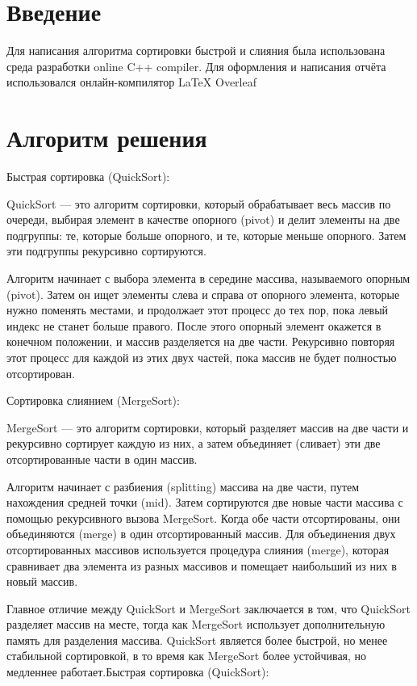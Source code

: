 \documentclass[14pt,a4paper]{scrartcl}
\begin{document}
\tableofcontents
\newpage
\section{Введение}
Для написания алгоритма сортировки быстрой и слияния  была использована среда разработки online C++ compiler. Для оформления и написания отчёта использовался онлайн-компилятор LaTeX Overleaf


\newpage
\section{Алгоритм решения}
Быстрая сортировка (QuickSort):

QuickSort — это алгоритм сортировки, который обрабатывает весь массив по очереди, выбирая элемент в качестве опорного (pivot) и делит элементы на две подгруппы: те, которые больше опорного, и те, которые меньше опорного. Затем эти подгруппы рекурсивно сортируются.

Алгоритм начинает с выбора элемента в середине массива, называемого опорным (pivot). Затем он ищет элементы слева и справа от опорного элемента, которые нужно поменять местами, и продолжает этот процесс до тех пор, пока левый индекс не станет больше правого. После этого опорный элемент окажется в конечном положении, и массив разделяется на две части. Рекурсивно повторяя этот процесс для каждой из этих двух частей, пока массив не будет полностью отсортирован.

Сортировка слиянием (MergeSort):

MergeSort — это алгоритм сортировки, который разделяет массив на две части и рекурсивно сортирует каждую из них, а затем объединяет (сливает) эти две отсортированные части в один массив.

Алгоритм начинает с разбиения (splitting) массива на две части, путем нахождения средней точки (mid). Затем сортируются две новые части массива с помощью рекурсивного вызова MergeSort. Когда обе части отсортированы, они объединяются (merge) в один отсортированный массив. Для объединения двух отсортированных массивов используется процедура слияния (merge), которая сравнивает два элемента из разных массивов и помещает наибольший из них в новый массив.

Главное отличие между QuickSort и MergeSort заключается в том, что QuickSort разделяет массив на месте, тогда как MergeSort использует дополнительную память для разделения массива. QuickSort является более быстрой, но менее стабильной сортировкой, в то время как MergeSort более устойчивая, но медленнее работает.Быстрая сортировка (QuickSort):
\end{document}
